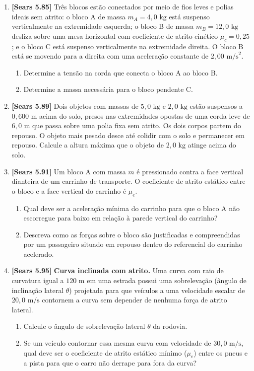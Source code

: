 \documentclass[11pt,a4paper]{article}
\begin{document}
\begin{enumerate}[label=\textbf{\arabic*.}, leftmargin=*, itemsep=0.45cm, resume]
\item \textbf{[Sears 5.85]} Três blocos estão conectados por meio de fios leves e polias ideais sem atrito: o bloco A de massa $m_A = 4,0\text{ kg}$ está suspenso verticalmente na extremidade esquerda; o bloco B de massa $m_B = 12,0\text{ kg}$ desliza sobre uma mesa horizontal com coeficiente de atrito cinético $\mu_c = 0,25$; e o bloco C está suspenso verticalmente na extremidade direita. O bloco B está se movendo para a direita com uma aceleração constante de $2,00\text{ m/s}^2$.
\begin{enumerate}[label=\alph*)]
    \item Determine a tensão na corda que conecta o bloco A ao bloco B.
    \item Determine a massa necessária para o bloco pendente C.
\end{enumerate}

\item \textbf{[Sears 5.89]} Dois objetos com massas de $5,0\text{ kg}$ e $2,0\text{ kg}$ estão suspensos a $0,600\text{ m}$ acima do solo, presos nas extremidades opostas de uma corda leve de $6,0\text{ m}$ que passa sobre uma polia fixa sem atrito. Os dois corpos partem do repouso. O objeto mais pesado desce até colidir com o solo e permanecer em repouso. Calcule a altura máxima que o objeto de $2,0\text{ kg}$ atinge acima do solo.

\item \textbf{[Sears 5.91]} Um bloco A com massa $m$ é pressionado contra a face vertical dianteira de um carrinho de transporte. O coeficiente de atrito estático entre o bloco e a face vertical do carrinho é $\mu_e$.
\begin{enumerate}[label=\alph*)]
    \item Qual deve ser a aceleração mínima do carrinho para que o bloco A não escorregue para baixo em relação à parede vertical do carrinho?
    \item Descreva como as forças sobre o bloco são justificadas e compreendidas por um passageiro situado em repouso dentro do referencial do carrinho acelerado.
\end{enumerate}

\item \textbf{[Sears 5.95]} \textbf{Curva inclinada com atrito.} Uma curva com raio de curvatura igual a $120\text{ m}$ em uma estrada possui uma sobrelevação (ângulo de inclinação lateral $\theta$) projetada para que veículos a uma velocidade escalar de $20,0\text{ m/s}$ contornem a curva sem depender de nenhuma força de atrito lateral.
\begin{enumerate}[label=\alph*)]
    \item Calcule o ângulo de sobrelevação lateral $\theta$ da rodovia.
    \item Se um veículo contornar essa mesma curva com velocidade de $30,0\text{ m/s}$, qual deve ser o coeficiente de atrito estático mínimo ($\mu_e$) entre os pneus e a pista para que o carro não derrape para fora da curva?
\end{enumerate}


\end{enumerate}
\end{document}
